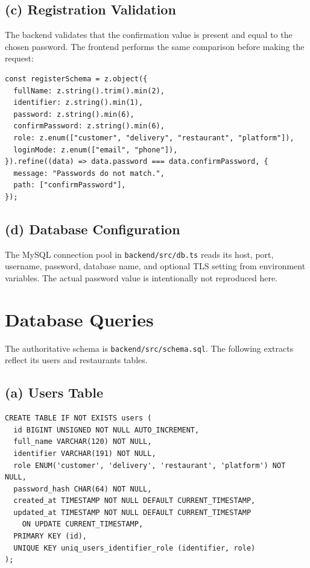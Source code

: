 \subsection*{(c) Registration Validation}

The backend validates that the confirmation value is present and equal to the chosen password. The frontend performs the same comparison before making the request:

\begin{tcolorbox}[colback=gray!5,colframe=black,title=Registration Schema]
\begin{verbatim}
const registerSchema = z.object({
  fullName: z.string().trim().min(2),
  identifier: z.string().min(1),
  password: z.string().min(6),
  confirmPassword: z.string().min(6),
  role: z.enum(["customer", "delivery", "restaurant", "platform"]),
  loginMode: z.enum(["email", "phone"]),
}).refine((data) => data.password === data.confirmPassword, {
  message: "Passwords do not match.",
  path: ["confirmPassword"],
});
\end{verbatim}
\end{tcolorbox}

\subsection*{(d) Database Configuration}

The MySQL connection pool in \texttt{backend/src/db.ts} reads its host, port, username, password, database name, and optional TLS setting from environment variables. The actual password value is intentionally not reproduced here.

\section{Database Queries}

The authoritative schema is \texttt{backend/src/schema.sql}. The following extracts reflect its users and restaurants tables.

\subsection*{(a) Users Table}

\begin{tcolorbox}[colback=gray!5,colframe=black,title=Users Table Schema]
\begin{verbatim}
CREATE TABLE IF NOT EXISTS users (
  id BIGINT UNSIGNED NOT NULL AUTO_INCREMENT,
  full_name VARCHAR(120) NOT NULL,
  identifier VARCHAR(191) NOT NULL,
  role ENUM('customer', 'delivery', 'restaurant', 'platform') NOT NULL,
  password_hash CHAR(64) NOT NULL,
  created_at TIMESTAMP NOT NULL DEFAULT CURRENT_TIMESTAMP,
  updated_at TIMESTAMP NOT NULL DEFAULT CURRENT_TIMESTAMP
    ON UPDATE CURRENT_TIMESTAMP,
  PRIMARY KEY (id),
  UNIQUE KEY uniq_users_identifier_role (identifier, role)
);
\end{verbatim}
\end{tcolorbox}


